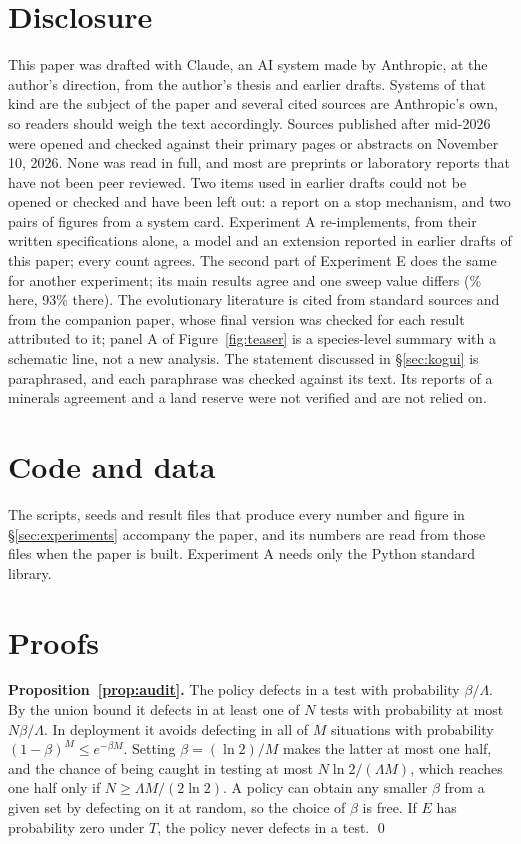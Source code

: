 \documentclass[10pt,twocolumn]{article}
\theoremstyle{plain}
\theoremstyle{definition}
\newcommand{\para}[1]{\smallskip\noindent\textbf{#1}\enspace}
\begin{document}
\section*{Disclosure}
\small
This paper was drafted with Claude, an AI system made by Anthropic, at the author's
direction, from the author's thesis and earlier drafts. Systems of that kind are the subject
of the paper and several cited sources are Anthropic's own, so readers should weigh the text
accordingly. Sources published after mid-2026 were opened and checked against their primary
pages or abstracts on November 10, 2026. None was read in full, and most are preprints or
laboratory reports that have not been peer reviewed. Two items used in earlier drafts could not be opened or checked and have been left out: a
report on a stop mechanism, and two pairs of figures from a system card. Experiment A
re-implements, from their written specifications alone, a model and an extension reported in
earlier drafts of this paper; every count agrees. The second part of Experiment E does the
same for another experiment; its main results agree and one sweep value differs
(\ScConfSixty\% here, 93\% there). The evolutionary
literature is cited from standard sources and from the companion paper, whose final version
was checked for each result attributed to it; panel A of Figure~\ref{fig:teaser} is a
species-level summary with a schematic line, not a new analysis. The statement discussed in
\S\ref{sec:kogui} is paraphrased, and each paraphrase was checked against its text. Its
reports of a minerals agreement and a land reserve were not verified and are not relied on.

\section*{Code and data}
\small
The scripts, seeds and result files that produce every number and figure in
\S\ref{sec:experiments} accompany the paper, and its numbers are read from those files when
the paper is built. Experiment A needs only the Python standard library.
\normalsize

\appendix
\section{Proofs}\label{app:proofs}
\small

\para{Proposition~\ref{prop:audit}.} The policy defects in a test with probability
$\beta/\Lambda$. By the union bound it defects in at least one of $N$ tests with probability
at most $N\beta/\Lambda$. In deployment it avoids defecting in all of $M$ situations with
probability $(1-\beta)^{M}\le e^{-\beta M}$. Setting $\beta=(\ln 2)/M$ makes the latter at
most one half, and the chance of being caught in testing at most $N\ln 2/(\Lambda M)$, which
reaches one half only if $N\ge \Lambda M/(2\ln 2)$. A policy can obtain any smaller $\beta$
from a given set by defecting on it at random, so the choice of $\beta$ is free. If $E$ has
probability zero under $T$, the policy never defects in a test. \qed
\end{document}
